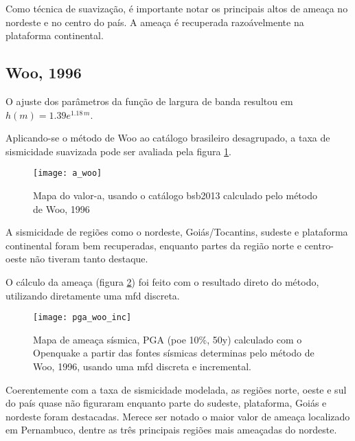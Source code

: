 Como técnica de suavização, é importante notar os principais altos de ameaça no nordeste e no centro do país.
A ameaça é recuperada razoávelmente na plataforma continental.

\subsection{Woo, 1996}
\label{sec:woo_resultados}

O ajuste dos parâmetros da função de largura de banda resultou em $h(m)=1.39e^{1.18\,m}$.

Aplicando-se o método de Woo ao catálogo brasileiro desagrupado, a taxa de sismicidade suavizada 
pode ser avaliada pela figura \ref{fig:a_woo}.

\begin{figure}[H]
  \centering
  \texttt{[image: a\_woo]} 
  \caption{Mapa do valor-a, usando o catálogo \gls{bsb2013} calculado pelo método de Woo, 1996 }
  \label{fig:a_woo} 
\end{figure}

A sismicidade de regiões como o nordeste, Goiás/Tocantins, sudeste e plataforma continental 
foram bem recuperadas, enquanto partes da região norte e centro-oeste não tiveram tanto destaque. 

O cálculo da ameaça (figura \ref{fig:pga_woo_inc}) foi feito com o resultado direto do método, utilizando
diretamente uma \gls{mfd} discreta.
\begin{figure}[H]
  \centering
  \texttt{[image: pga\_woo\_inc]} 
  \caption{Mapa de ameaça sísmica, PGA (poe 10\%, 50y) 
  		   calculado com o Openquake a partir das fontes sísmicas
  		   determinas pelo método de Woo, 1996, usando uma \gls{mfd}
  		   discreta e incremental.
  }
  \label{fig:pga_woo_inc} 
\end{figure}

Coerentemente com a taxa de sismicidade modelada, as regiões norte, oeste e sul do país quase não figuraram 
enquanto parte do sudeste, plataforma, Goiás e nordeste foram destacadas. Merece ser notado o maior valor de ameaça
localizado em Pernambuco, dentre as três principais regiões mais ameaçadas do nordeste.

